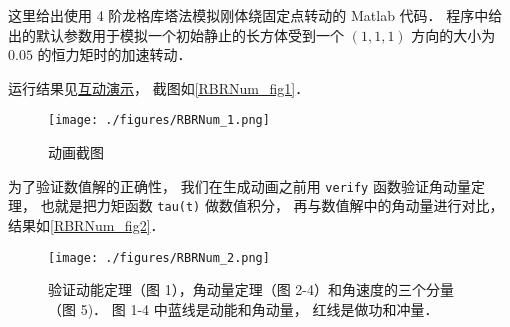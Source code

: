 

这里给出使用 4 阶龙格库塔法模拟刚体绕固定点转动的 Matlab 代码． 程序中给出的默认参数用于模拟一个初始静止的长方体受到一个 $(1,1,1)$ 方向的大小为 $0.05$ 的恒力矩时的加速转动．

运行结果见\href{https://wuli.wiki/apps/rigBdRot.html}{互动演示}， 截图如\autoref{RBRNum_fig1}．

\begin{figure}[ht]
\centering
\texttt{[image: ./figures/RBRNum\_1.png]}
\caption{动画截图} \label{RBRNum_fig1}
\end{figure}

为了验证数值解的正确性， 我们在生成动画之前用 \verb|verify| 函数验证角动量定理， 也就是把力矩函数 \verb|tau(t)| 做数值积分， 再与数值解中的角动量进行对比， 结果如\autoref{RBRNum_fig2}．
\begin{figure}[ht]
\centering
\texttt{[image: ./figures/RBRNum\_2.png]}
\caption{验证动能定理（图 1），角动量定理（图 2-4）和角速度的三个分量（图 5)． 图 1-4 中蓝线是动能和角动量， 红线是做功和冲量．} \label{RBRNum_fig2}
\end{figure}

